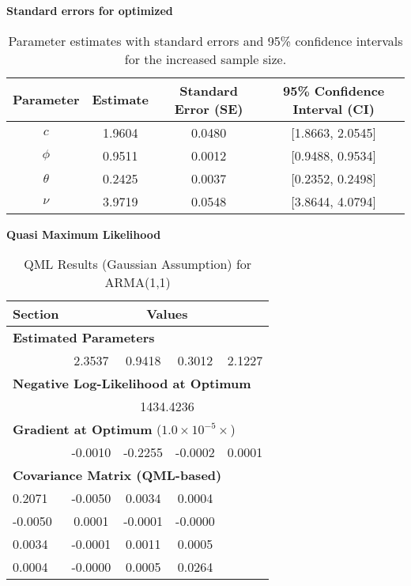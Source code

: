 \documentclass[12pt]{article}
\begin{document}
\textbf{Standard errors for optimized}
\begin{table}[h!]
\centering
\begin{tabular}{|c|c|c|c|}
\hline
\textbf{Parameter} & \textbf{Estimate} & \textbf{Standard Error (SE)} & \textbf{95\% Confidence Interval (CI)} \\ \hline
$c$     & 1.9604 & 0.0480 & [1.8663, 2.0545] \\ \hline
$\phi$  & 0.9511 & 0.0012 & [0.9488, 0.9534] \\ \hline
$\theta$ & 0.2425 & 0.0037 & [0.2352, 0.2498] \\ \hline
$\nu$    & 3.9719 & 0.0548 & [3.8644, 4.0794] \\ \hline
\end{tabular}
\caption{Parameter estimates with standard errors and 95\% confidence intervals for the increased sample size.}
\label{tab:confidence_intervals_large_sample}
\end{table}



\textbf{Quasi Maximum Likelihood}
\begin{table}[h!]
\centering
\caption{QML Results (Gaussian Assumption) for ARMA(1,1)}
\label{tab:qml_results}
\begin{tabular}{@{}lcccc@{}}
\toprule
\textbf{Section} & \multicolumn{4}{c}{\textbf{Values}} \\
\midrule
\multicolumn{5}{l}{\textbf{Estimated Parameters}} \\
\cmidrule(l){2-5}
 & 2.3537 & 0.9418 & 0.3012 & 2.1227 \\
\midrule
\multicolumn{5}{l}{\textbf{Negative Log-Likelihood at Optimum}} \\
\cmidrule(l){2-5}
 & \multicolumn{4}{c}{1434.4236} \\
\midrule
\multicolumn{5}{l}{\textbf{Gradient at Optimum} ($1.0 \times 10^{-5} \times$)} \\
\cmidrule(l){2-5}
 & -0.0010 & -0.2255 & -0.0002 & 0.0001 \\
\midrule
\multicolumn{5}{l}{\textbf{Covariance Matrix (QML-based)}} \\
\cmidrule(l){1-5}
0.2071 & -0.0050 & 0.0034 & 0.0004 & \\
-0.0050 & 0.0001 & -0.0001 & -0.0000 & \\
0.0034 & -0.0001 & 0.0011 & 0.0005 & \\
0.0004 & -0.0000 & 0.0005 & 0.0264 & \\
\bottomrule
\end{tabular}
\end{table}
\end{document}
